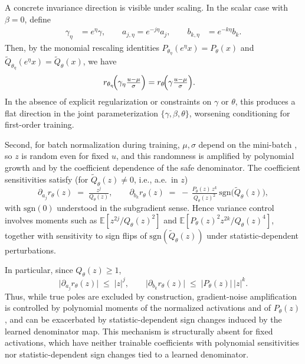 \documentclass{article}
\theoremstyle{plain}
\theoremstyle{definition}
\theoremstyle{remark}
\begin{document}
A concrete invariance direction is visible under scaling. In the scalar case with $\beta=0$, define
\begin{equation}
\begin{aligned}
\gamma_\eta &= e^\eta\gamma,\qquad
a_{j,\eta}=e^{-j\eta}a_j,\qquad
b_{k,\eta} &= e^{-k\eta}b_k .
\end{aligned}
\label{eq:scale_gauge_app}
\end{equation}
Then, by the monomial rescaling identities $P_{\theta_\eta}(e^\eta x)=P_\theta(x)$ and $\widetilde{Q}_{\theta_\eta}(e^\eta x)=\widetilde{Q}_\theta(x)$, we have
\begin{equation}
\begin{aligned}
r_{\theta_\eta}\!\Bigl(\gamma_\eta \tfrac{u-\mu}{\sigma}\Bigr)
&= r_\theta\!\Bigl(\gamma \tfrac{u-\mu}{\sigma}\Bigr).
\end{aligned}
\label{eq:gauge_invariance_app}
\end{equation}
In the absence of explicit regularization or constraints on $\gamma$ or $\theta$, this produces a flat direction in the joint parameterization $\{\gamma,\beta,\theta\}$, worsening conditioning for first-order training.

Second, for batch normalization during training, $\mu,\sigma$ depend on the mini-batch \citep{ioffe2015batch}, so $z$ is random even for fixed $u$, and this randomness is amplified by polynomial growth and by the coefficient dependence of the safe denominator. The coefficient sensitivities satisfy (for $\widetilde{Q}_\theta(z)\neq 0$, i.e., a.e.\ in $z$)
\begin{equation}
\partial_{a_j} r_\theta(z) \;=\; \tfrac{z^j}{Q_\theta(z)},\qquad 
\partial_{b_k} r_\theta(z) \;=\; -\,\tfrac{P_\theta(z)\,z^k}{Q_\theta(z)^2}\,
\mathrm{sgn}\!\bigl(\widetilde{Q}_\theta(z)\bigr),
\label{eq:grad_coeff_app}
\end{equation}
with $\mathrm{sgn}(0)$ understood in the subgradient sense. Hence variance control involves moments such as $\mathbb{E}\!\left[z^{2j}/Q_\theta(z)^2\right]$ and $\mathbb{E}\!\left[P_\theta(z)^2 z^{2k}/Q_\theta(z)^4\right]$, together with sensitivity to sign flips of $\mathrm{sgn}(\widetilde{Q}_\theta(z))$ under statistic-dependent perturbations.

In particular, since $Q_\theta(z)\ge 1$,
\begin{equation}
\bigl|\partial_{a_j} r_\theta(z)\bigr| \;\le\; |z|^j,\qquad 
\bigl|\partial_{b_k} r_\theta(z)\bigr| \;\le\; |P_\theta(z)|\,|z|^k .
\label{eq:grad_bounds_app}
\end{equation}
Thus, while true poles are excluded by construction, gradient-noise amplification is controlled by polynomial moments of the normalized activations and of $P_\theta(z)$, and can be exacerbated by statistic-dependent sign changes induced by the learned denominator map. This mechanism is structurally absent for fixed activations, which have neither trainable coefficients with polynomial sensitivities nor statistic-dependent sign changes tied to a learned denominator.
\end{document}
